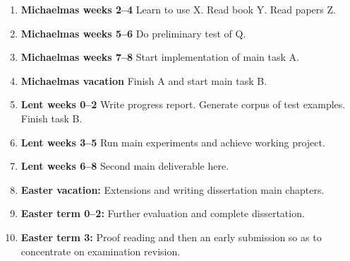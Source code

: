 \documentclass[12pt,a4paper,twoside]{article}
\begin{document}
\begin{enumerate}

\item \textbf{Michaelmas weeks 2--4} Learn to use X. Read book Y. Read papers Z.

\item \textbf{Michaelmas weeks 5--6} Do preliminary test of Q.

\item \textbf{Michaelmas weeks 7--8} Start implementation of main task A.

\item \textbf{Michaelmas vacation} Finish A and start main task B.

\item \textbf{Lent weeks 0--2} Write progress report. Generate corpus of
  test examples. Finish task B.

\item \textbf{Lent weeks 3--5} Run main experiments and achieve working project.

\item \textbf{Lent weeks 6--8} Second main deliverable here. 
\item \textbf{Easter vacation:} Extensions and writing dissertation main
  chapters.

\item \textbf{Easter term 0--2:}  Further evaluation and complete dissertation.

\item \textbf{Easter term 3:} Proof reading and then an early submission
  so as to concentrate on examination revision.

\end{enumerate}
\end{document}

